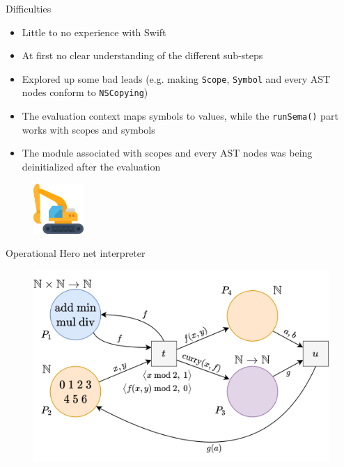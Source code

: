 \documentclass[10pt]{beamer}
\begin{document}
\begin{frame}[fragile]{Difficulties}
    \begin{itemize}
        \setlength\itemsep{1.05em}
        \item Little to no experience with Swift
        \item At first no clear understanding of the different sub-steps
        \item Explored up some bad leads (e.g. making \texttt{Scope}, \texttt{Symbol} and every AST nodes conform to
          \texttt{NSCopying})
        \item The evaluation context maps symbols to values, while the \texttt{runSema()} part works with scopes and
          symbols
        \item The module associated with scopes and every AST nodes was being deinitialized after the evaluation
    \end{itemize}
    \begin{figure}
        \centering
        \includegraphics[width=0.17\textwidth]{05deinit.png}
    \end{figure}
\end{frame}

\begin{frame}[fragile]{Operational Hero net interpreter}
    \begin{figure}
        \centering
        \includegraphics[width=1.0\textwidth]{06heronetexample.png}
    \end{figure}
\end{frame}
\end{document}
